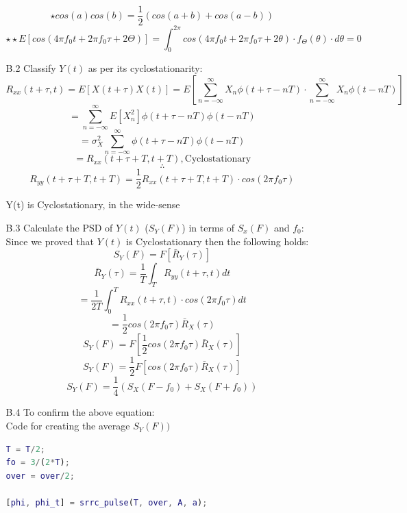 \documentclass[12pt, a4paper]{article}
\begin{document}
\begin{enumerate}
\begin{enumerate}
		\[\star cos(a)cos(b) = \frac{1}{2}(cos(a+b)+cos(a-b))\]
		\[\star\star E[cos(4\pi f_0t+2\pi f_0 \tau + 2\Theta)] = \int_{0}^{2\pi}cos(4\pi f_0t+2\pi f_0 \tau + 2\theta)\cdot f_{\Theta}(\theta)\cdot d\theta = 0\]
		\item[B.2] Classify \(Y(t)\) as per its cyclostationarity:
		\[R_{xx}(t+\tau , t) = E[X(t+\tau)X(t)] = E\left[\sum_{n=-\infty}^{\infty} X_n\phi(t+\tau-nT) \cdot \sum_{n=-\infty}^{\infty} X_n\phi(t-nT)\right]\]
		\[= \sum_{n=-\infty}^{\infty} E[X_n^2] \phi(t + \tau -nT)\phi(t-nT)\]
		\[ = \sigma_X^2 \sum_{n=-\infty}^{\infty} \phi(t + \tau -nT)\phi(t-nT)\]
		\[ = \boxed{R_{xx}(t+\tau+T, t+T), \text{Cyclostationary}}\]
		\[\therefore\]
		\[\boxed{R_{yy}(t+\tau+T, t+T) = \frac{1}{2}R_{xx}(t+\tau +T,t+T)\cdot cos(2\pi f_0\tau)}\]
		\begin{center}
			 Y(t) is Cyclostationary, in the wide-sense
		\end{center}
		\item[B.3] Calculate the PSD of \(Y(t)\) (\(S_Y(F)\)) in terms of \(S_x(F)\) and \(f_0\):\\
		Since we proved that \(Y(t)\) is Cyclostationary then the following holds:
		\[S_Y(F) = F[\bar{R}_Y(\tau)]\]
		\[\bar{R}_Y(\tau) = \frac{1}{T}\int_{T}R_{yy}(t+\tau,t)dt\]
		\[=  \frac{1}{2T}\int_{0}^{T} R_{xx}(t+\tau,t)\cdot cos(2\pi f_0 \tau) dt\]
		\[ = \frac{1}{2}cos(2\pi f_0 \tau)\bar{R}_X(\tau)\]
		\[S_Y(F) = F\left[\frac{1}{2}cos(2\pi f_0 \tau)\bar{R}_X(\tau)\right]\]
		\[S_Y(F) = \frac{1}{2}F\left[cos(2\pi f_0 \tau)\bar{R}_X(\tau)\right]\]
		\[\boxed{S_Y(F) = \frac{1}{4}(S_X(F-f_0) + S_X(F+f_0))}\]
		\item[B.4] To confirm the above equation:\\
		Code for creating the average \(S_Y(F))\)
		\begin{lstlisting}[language=MATLAB]
T = T/2;
fo = 3/(2*T);
over = over/2;

[phi, phi_t] = srrc_pulse(T, over, A, a);


\end{lstlisting}
\end{enumerate}
\end{enumerate}
\end{document}
